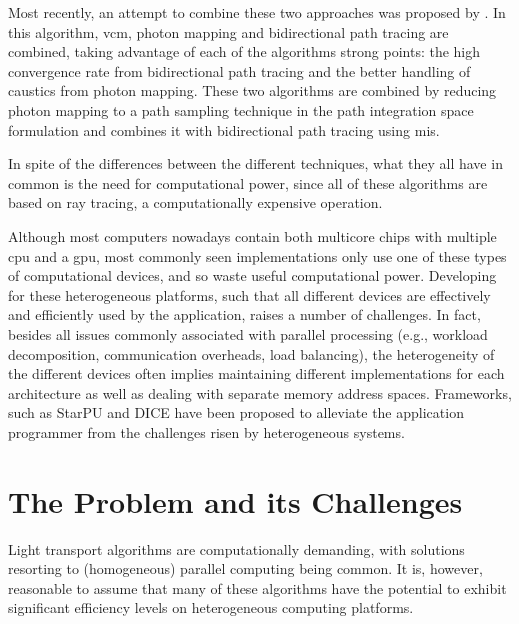 Most recently, an attempt to combine these two approaches was proposed by \cite{Georgiev}. In this algorithm, \gls{vcm}, photon mapping and bidirectional path tracing are combined, taking advantage of each of the algorithms strong points: the high convergence rate from bidirectional path tracing and the better handling of caustics from photon mapping. These two algorithms are combined by reducing photon mapping to a path sampling technique in the path integration space formulation and combines it with bidirectional path tracing using \gls{mis}.

In spite of the differences between the different techniques, what they all have in common is the need for computational power, since all of these algorithms are based on ray tracing, a computationally expensive operation.

Although most computers nowadays contain both multicore chips with multiple \gls{cpu} and a \gls{gpu}, most commonly seen implementations only use one of these types of computational devices, and so waste useful computational power. Developing for these heterogeneous platforms, such that all different devices are effectively and efficiently used by the application, raises a number of challenges. In fact, besides all issues commonly associated with parallel processing (e.g., workload decomposition, communication overheads, load balancing), the heterogeneity of the different devices often implies maintaining different implementations for each architecture as well as dealing with separate memory address spaces.
Frameworks, such as StarPU \citep{augonnet2011starpu} and DICE \citep{Barbosa} have been proposed to alleviate the application programmer from the challenges risen by heterogeneous systems. 

\section{The Problem and its Challenges}


Light transport algorithms are computationally demanding, with solutions resorting to (homogeneous) parallel computing being common. It is, however, reasonable to assume that many of these algorithms have the potential to exhibit significant efficiency levels on heterogeneous computing platforms.

